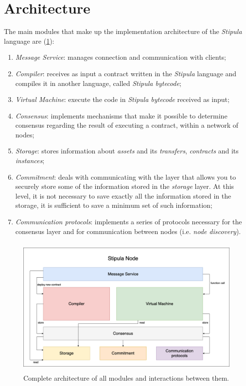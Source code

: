 \newpage
\section{Architecture}

The main modules that make up the implementation architecture of the \textit{Stipula} language are
(\ref{fig:complete-architecture}):
\begin{enumerate}
	\item \textit{Message Service}: manages connection and communication with clients;
	\item \textit{Compiler}: receives as input a contract written in the \textit{Stipula} language and 
	compiles it in another language, called \textit{Stipula bytecode};
	\item \textit{Virtual Machine}: execute the code in \textit{Stipula bytecode} received as input;
	\item \textit{Consensus}: implements mechanisms that make it possible to determine consensus regarding the 
	result of executing a contract, within a network of nodes;
	\item \textit{Storage}: stores information about \textit{assets} and its \textit{transfers}, 
	\textit{contracts} and its \textit{instances};
	\item \textit{Commitment}: deals with communicating with the layer that allows you to securely store some 
	of the information stored in the \textit{storage} layer. At this level, it is not necessary to save 
	exactly all the information stored in the storage, it is sufficient to save a minimum set of such 
	information;
	\item \textit{Communication protocols}: implements a series of protocols necessary for the consensus layer 
	and for communication between nodes (i.e. \textit{node discovery}).
\end{enumerate}

\begin{figure}[htbp]
	\begin{center}
		\includegraphics[height=7cm]{immagini/capitolo-4/complete-architecture.png}
		\caption{Complete architecture of all modules and interactions between them.}
		\label{fig:complete-architecture}
	\end{center}
\end{figure}

